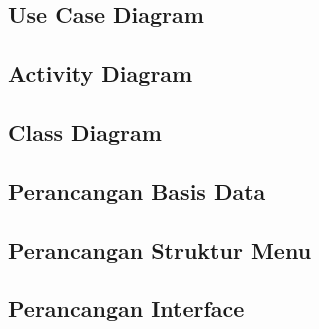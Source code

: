 \subsection{Use Case Diagram}
\subsection{Activity Diagram}
\subsection{Class Diagram}
\subsection{Perancangan Basis Data}
\subsection{Perancangan Struktur Menu}
\subsection{Perancangan Interface}